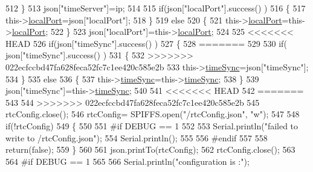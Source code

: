 \begin{DoxyCode}
512             \}
513             json[\textcolor{stringliteral}{"timeServer"}]=ip;
514             
515             \textcolor{keywordflow}{if}(json[\textcolor{stringliteral}{"localPort"}].success() )
516             \{                       
517                 this->\hyperlink{classCoolTime_a2f777da44d7ba678be8185299e9b49d1}{localPort}=json[\textcolor{stringliteral}{"localPort"}];
518             \}
519             \textcolor{keywordflow}{else}
520             \{
521                 this->\hyperlink{classCoolTime_a2f777da44d7ba678be8185299e9b49d1}{localPort}=this->\hyperlink{classCoolTime_a2f777da44d7ba678be8185299e9b49d1}{localPort};
522             \}
523             json[\textcolor{stringliteral}{"localPort"}]=this->\hyperlink{classCoolTime_a2f777da44d7ba678be8185299e9b49d1}{localPort};
524 
525 <<<<<<< HEAD
526             \textcolor{keywordflow}{if}(json[\textcolor{stringliteral}{"timeSync"}].success() )
527             \{                       
528 =======
529 
530             \textcolor{keywordflow}{if}( json[\textcolor{stringliteral}{"timeSync"}].success() )
531             \{
532 >>>>>>> 022ecfccbd47fa628feca52fc7c1ee420c585e2b
533                 this->\hyperlink{classCoolTime_a9d032e76c3470a15b3bbbc52af6463f7}{timeSync}=json[\textcolor{stringliteral}{"timeSync"}];
534             \}
535             \textcolor{keywordflow}{else}
536             \{
537                 this->\hyperlink{classCoolTime_a9d032e76c3470a15b3bbbc52af6463f7}{timeSync}=this->\hyperlink{classCoolTime_a9d032e76c3470a15b3bbbc52af6463f7}{timeSync};
538             \}
539             json[\textcolor{stringliteral}{"timeSync"}]=this->\hyperlink{classCoolTime_a9d032e76c3470a15b3bbbc52af6463f7}{timeSync};
540 
541 <<<<<<< HEAD
542 =======
543 
544 >>>>>>> 022ecfccbd47fa628feca52fc7c1ee420c585e2b
545             rtcConfig.close();
546             rtcConfig= SPIFFS.open(\textcolor{stringliteral}{"/rtcConfig.json"}, \textcolor{stringliteral}{"w"});
547             
548             \textcolor{keywordflow}{if}(!rtcConfig)
549             \{
550             
551 \textcolor{preprocessor}{            #if DEBUG == 1}
552 
553                 Serial.println(\textcolor{stringliteral}{"failed to write to /rtcConfig.json"});
554                 Serial.println();
555             
556 \textcolor{preprocessor}{            #endif}
557 
558                 \textcolor{keywordflow}{return}(\textcolor{keyword}{false});
559             \}
560             
561             json.printTo(rtcConfig);
562             rtcConfig.close();
563 
564 \textcolor{preprocessor}{        #if DEBUG == 1 }
565 
566             Serial.println(\textcolor{stringliteral}{"configuration is :"});

\end{DoxyCode}
